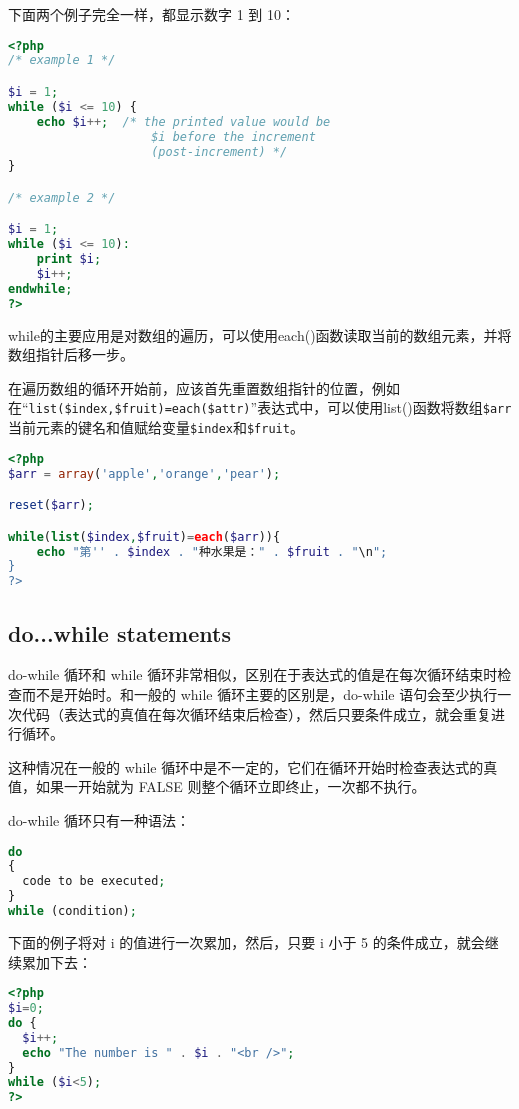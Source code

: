 下面两个例子完全一样，都显示数字 1 到 10：

\begin{lstlisting}[language=PHP]
<?php
/* example 1 */

$i = 1;
while ($i <= 10) {
    echo $i++;  /* the printed value would be
                    $i before the increment
                    (post-increment) */
}

/* example 2 */

$i = 1;
while ($i <= 10):
    print $i;
    $i++;
endwhile;
?>
\end{lstlisting}

while的主要应用是对数组的遍历，可以使用each()函数读取当前的数组元素，并将数组指针后移一步。


在遍历数组的循环开始前，应该首先重置数组指针的位置，例如在“\texttt{list(\$index,\$fruit)=each(\$attr)}”表达式中，可以使用list()函数将数组\texttt{\$arr}当前元素的键名和值赋给变量\texttt{\$index}和\texttt{\$fruit}。

\begin{lstlisting}[language=PHP]
<?php
$arr = array('apple','orange','pear');

reset($arr);

while(list($index,$fruit)=each($arr)){
	echo "第'' . $index . "种水果是：" . $fruit . "\n";
}
?>
\end{lstlisting}


\subsection{do...while statements}

do-while 循环和 while 循环非常相似，区别在于表达式的值是在每次循环结束时检查而不是开始时。和一般的 while 循环主要的区别是，do-while 语句会至少执行一次代码（表达式的真值在每次循环结束后检查），然后只要条件成立，就会重复进行循环。

这种情况在一般的 while 循环中是不一定的，它们在循环开始时检查表达式的真值，如果一开始就为 FALSE 则整个循环立即终止，一次都不执行。

do-while 循环只有一种语法：

\begin{lstlisting}[language=PHP]
do
{
  code to be executed;
}
while (condition); 
\end{lstlisting}

下面的例子将对 i 的值进行一次累加，然后，只要 i 小于 5 的条件成立，就会继续累加下去：

\begin{lstlisting}[language=PHP]
<?php 
$i=0;
do {
  $i++;
  echo "The number is " . $i . "<br />";
}
while ($i<5);
?>
\end{lstlisting}

